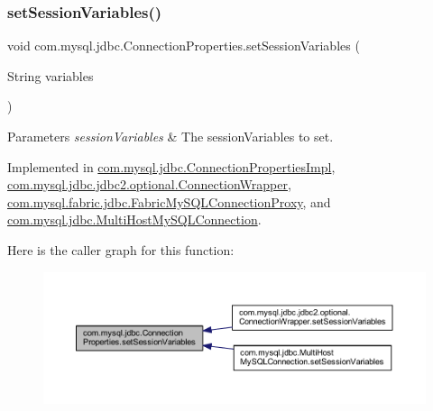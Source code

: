 \subsubsection{\texorpdfstring{set\+Session\+Variables()}{setSessionVariables()}}
{\footnotesize\ttfamily void com.\+mysql.\+jdbc.\+Connection\+Properties.\+set\+Session\+Variables (\begin{DoxyParamCaption}\item[{String}]{variables }\end{DoxyParamCaption})}


\begin{DoxyParams}{Parameters}
{\em session\+Variables} & The session\+Variables to set. \\
\hline
\end{DoxyParams}


Implemented in \mbox{\hyperlink{classcom_1_1mysql_1_1jdbc_1_1_connection_properties_impl_ab45209f886ce9eaa0ad7134674db924e}{com.\+mysql.\+jdbc.\+Connection\+Properties\+Impl}}, \mbox{\hyperlink{classcom_1_1mysql_1_1jdbc_1_1jdbc2_1_1optional_1_1_connection_wrapper_a7c272bd82ff6771c2ab657ee759dfa00}{com.\+mysql.\+jdbc.\+jdbc2.\+optional.\+Connection\+Wrapper}}, \mbox{\hyperlink{classcom_1_1mysql_1_1fabric_1_1jdbc_1_1_fabric_my_s_q_l_connection_proxy_a820718c33320935470042cfde6d68257}{com.\+mysql.\+fabric.\+jdbc.\+Fabric\+My\+S\+Q\+L\+Connection\+Proxy}}, and \mbox{\hyperlink{classcom_1_1mysql_1_1jdbc_1_1_multi_host_my_s_q_l_connection_ad1406aa3ec3a0b76716744c9be734d7f}{com.\+mysql.\+jdbc.\+Multi\+Host\+My\+S\+Q\+L\+Connection}}.

Here is the caller graph for this function\+:\nopagebreak
\begin{figure}[H]
\begin{center}
\leavevmode
\includegraphics[width=350pt]{interfacecom_1_1mysql_1_1jdbc_1_1_connection_properties_a9883494dfd2b4b2ed6905ecc13cc167d_icgraph}
\end{center}
\end{figure}
\mbox{\label{interfacecom_1_1mysql_1_1jdbc_1_1_connection_properties_a3cfee5c659ab60c5fdb925490d81ad0f}} 
